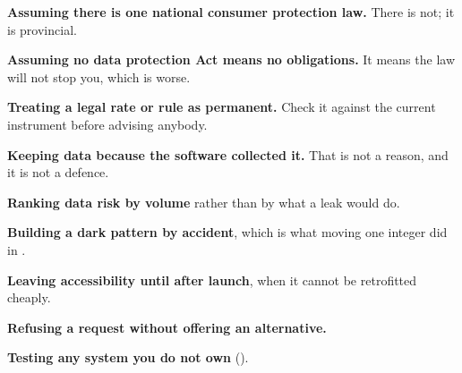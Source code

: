 \begin{pitfall}
\begin{tight}
  \item \textbf{Assuming there is one national consumer protection law.} There
        is not; it is provincial.
  \item \textbf{Assuming no data protection Act means no obligations.} It means
        the law will not stop you, which is worse.
  \item \textbf{Treating a legal rate or rule as permanent.} Check it against
        the current instrument before advising anybody.
  \item \textbf{Keeping data because the software collected it.} That is not a
        reason, and it is not a defence.
  \item \textbf{Ranking data risk by volume} rather than by what a leak would
        do.
  \item \textbf{Building a dark pattern by accident}, which is what moving one
        integer did in .
  \item \textbf{Leaving accessibility until after launch}, when it cannot be
        retrofitted cheaply.
  \item \textbf{Refusing a request without offering an alternative.}
  \item \textbf{Testing any system you do not own} ().
\end{tight}
\end{pitfall}

